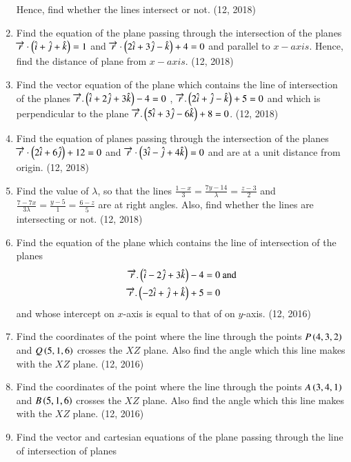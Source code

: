 \begin{enumerate}[label=\thesubsection.\arabic*, ref=\thesubsection.\theenumi]
Hence, find whether the lines intersect or not. \hfill (12, 2018)
\item Find the equation of the plane passing through the intersection of the planes $\overrightarrow{r} \cdot\left(\hat{i} + \hat{j} + \hat{k}\right)=1$ and $\overrightarrow{r} \cdot \left( 2\hat{i}+3\hat{j}-\hat{k}\right) +4=0$ and parallel to $x-axis$. Hence, find the distance of plane from $x-axis$.
\hfill (12, 2018)
\item Find the vector equation of the plane which contains the line of intersection of the planes $ \overrightarrow{r}.\left(\hat{i} + 2\hat{j}+3\hat{k}\right)-4=0$ , $\overrightarrow{r}.\left(2\hat{i} + \hat{j} - \hat{k}\right)+5=0$ and which is perpendicular to the plane $\overrightarrow{r}.\left(5\hat{i} + 3\hat{j} - 6\hat{k}\right)+8=0$.
\hfill (12, 2018)
\item Find the equation of planes passing through the intersection  of the planes $\overrightarrow{r} \cdot \left(2\hat{i}+6\hat{j}\right)+12=0$ and $\overrightarrow{r} \cdot \left(3\hat{i}-\hat{j}+4\hat{k}\right)=0$ and are at a unit distance from origin.
\hfill (12, 2018) 
\item Find the value of $\lambda$, so that the lines $\frac{1-x}{3}=\frac{7y-14}{\lambda}=\frac{z-3}{2}$ and $\frac{7-7x}{3\lambda}=\frac{y-5}{1}=\frac{6-z}{5}$ are at right angles. Also, find whether the lines are intersecting or not.       
\hfill (12, 2018) 
\item Find the equation of the plane which contains the line of intersection of the planes
      \begin{align*}
          \overrightarrow{r}.\begin{pmatrix}\hat{i} - 2\hat{j} + 3\hat{k}\end{pmatrix} - 4 & = 0 \text{  and} \\
          \overrightarrow{r}.\begin{pmatrix}-2\hat{i} + \hat{j} + \hat{k}\end{pmatrix} + 5 & = 0
      \end{align*}
      and whose intercept on $x$-axis is equal to that of on $y$-axis. \hfill (12, 2016)
\item Find the coordinates of the point where the line through the points $P\left(4, 3, 2\right)$ and $Q\left(5,1,6\right)$ crosses the $XZ$ plane. Also find the angle which this line makes with the $XZ$ plane. \hfill (12, 2016)
\item Find the coordinates of the point where the line through the points $A\left(3,4,1\right)$ and $B\left(5,1,6\right)$ crosses the $XZ$ plane. Also find the angle which this line makes with the $XZ$ plane. \hfill (12, 2016)
\item Find the vector and cartesian equations of the plane passing through the line of intersection of planes 

\end{enumerate}
